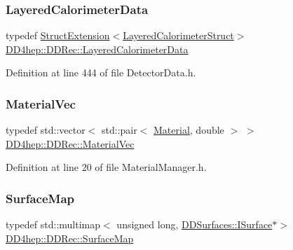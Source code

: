 \subsubsection{\texorpdfstring{Layered\+Calorimeter\+Data}{LayeredCalorimeterData}}
{\footnotesize\ttfamily typedef \hyperlink{struct_d_d4hep_1_1_d_d_rec_1_1_struct_extension}{Struct\+Extension}$<$\hyperlink{struct_d_d4hep_1_1_d_d_rec_1_1_layered_calorimeter_struct}{Layered\+Calorimeter\+Struct}$>$ \hyperlink{namespace_d_d4hep_1_1_d_d_rec_ab7bf707189c3166efa20740e6f7524b9}{D\+D4hep\+::\+D\+D\+Rec\+::\+Layered\+Calorimeter\+Data}}



Definition at line 444 of file Detector\+Data.\+h.

\hypertarget{namespace_d_d4hep_1_1_d_d_rec_a69fdab2f851316d2b9e50956920359f7}{}\label{namespace_d_d4hep_1_1_d_d_rec_a69fdab2f851316d2b9e50956920359f7} 
\subsubsection{\texorpdfstring{Material\+Vec}{MaterialVec}}
{\footnotesize\ttfamily typedef std\+::vector$<$ std\+::pair$<$ \hyperlink{class_d_d4hep_1_1_geometry_1_1_material}{Material}, double $>$ $>$ \hyperlink{namespace_d_d4hep_1_1_d_d_rec_a69fdab2f851316d2b9e50956920359f7}{D\+D4hep\+::\+D\+D\+Rec\+::\+Material\+Vec}}



Definition at line 20 of file Material\+Manager.\+h.

\hypertarget{namespace_d_d4hep_1_1_d_d_rec_a04db40c967eb23286f472ac1c17931d1}{}\label{namespace_d_d4hep_1_1_d_d_rec_a04db40c967eb23286f472ac1c17931d1} 
\subsubsection{\texorpdfstring{Surface\+Map}{SurfaceMap}}
{\footnotesize\ttfamily typedef std\+::multimap$<$ unsigned long, \hyperlink{class_d_d_surfaces_1_1_i_surface}{D\+D\+Surfaces\+::\+I\+Surface}$\ast$$>$ \hyperlink{namespace_d_d4hep_1_1_d_d_rec_a04db40c967eb23286f472ac1c17931d1}{D\+D4hep\+::\+D\+D\+Rec\+::\+Surface\+Map}}



